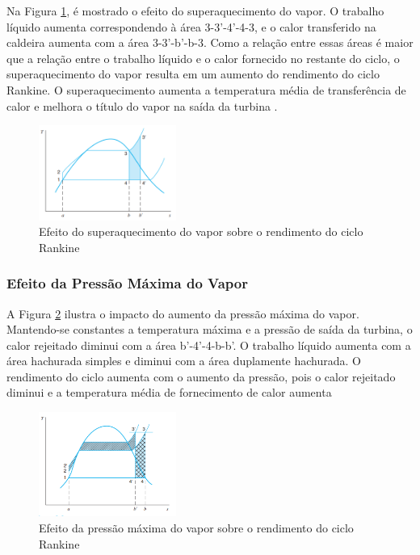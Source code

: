 \documentclass[
	article,			%
	11pt,				%
	oneside,			%
	a4paper,			%
	english,			%
	brazil,				%
	sumario=tradicional
	]{abntex2}
\begin{document}
Na Figura \ref{fig:efeito-vapor}, é mostrado o efeito do superaquecimento do vapor. O trabalho líquido aumenta correspondendo à área 3-3'-4'-4-3, e o calor transferido na caldeira aumenta com a área 3-3'-b'-b-3. Como a relação entre essas áreas é maior que a relação entre o trabalho líquido e o calor fornecido no restante do ciclo, o superaquecimento do vapor resulta em um aumento do rendimento do ciclo Rankine. O superaquecimento aumenta a temperatura média de transferência de calor e melhora o título do vapor na saída da turbina \cite{borgnakke-2020}.

\begin{figure}[h]
	\centering
	\includegraphics[width=0.4\textwidth]{./images/efeito-vapor.png}
	\caption{Efeito do superaquecimento do vapor sobre o rendimento do ciclo Rankine}
	\label{fig:efeito-vapor}
\end{figure}

\subsubsection{Efeito da Pressão Máxima do Vapor}

A Figura \ref{fig:efeito-max-vapor} ilustra o impacto do aumento da pressão máxima do vapor. Mantendo-se constantes a temperatura máxima e a pressão de saída da turbina, o calor rejeitado diminui com a área b'-4'-4-b-b'. O trabalho líquido aumenta com a área hachurada simples e diminui com a área duplamente hachurada. O rendimento do ciclo aumenta com o aumento da pressão, pois o calor rejeitado diminui e a temperatura média de fornecimento de calor aumenta

\begin{figure}[h]
	\centering
	\includegraphics[width=0.4\textwidth]{./images/efeito-max-vapor.png}
	\caption{Efeito da pressão máxima do vapor sobre o rendimento do ciclo Rankine}
	\label{fig:efeito-max-vapor}
\end{figure}
\end{document}
